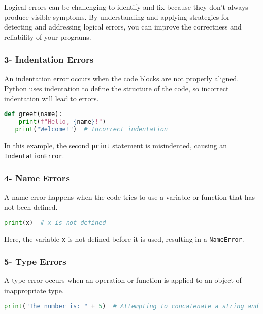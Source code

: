 Logical errors can be challenging to identify and fix because they don't always produce visible symptoms. By understanding and applying strategies for detecting and addressing logical errors, you can improve the correctness and reliability of your programs.

\subsubsection{3- Indentation Errors}

An indentation error occurs when the code blocks are not properly aligned. Python uses indentation to define the structure of the code, so incorrect indentation will lead to errors.

\begin{lstlisting}[language=Python, caption=Indentation Error Example]
def greet(name):
    print(f"Hello, {name}!")
   print("Welcome!")  # Incorrect indentation
\end{lstlisting}

In this example, the second \texttt{print} statement is misindented, causing an \texttt{IndentationError}.

\subsubsection{4- Name Errors}

A name error happens when the code tries to use a variable or function that has not been defined.

\begin{lstlisting}[language=Python, caption=Name Error Example]
print(x)  # x is not defined
\end{lstlisting}

Here, the variable \texttt{x} is not defined before it is used, resulting in a \texttt{NameError}.

\subsubsection{5- Type Errors}

A type error occurs when an operation or function is applied to an object of inappropriate type.

\begin{lstlisting}[language=Python, caption=Type Error Example]
print("The number is: " + 5)  # Attempting to concatenate a string and an integer
\end{lstlisting}

